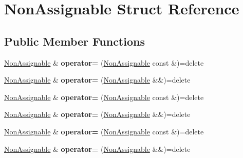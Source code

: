 \hypertarget{struct_non_assignable}{}\section{Non\+Assignable Struct Reference}
\label{struct_non_assignable}
\subsection*{Public Member Functions}
\begin{DoxyCompactItemize}
\item 
\mbox{\label{struct_non_assignable_aa1161016e3701d22b378b91ede9a65f8}} 
\mbox{\hyperlink{struct_non_assignable}{Non\+Assignable}} \& {\bfseries operator=} (\mbox{\hyperlink{struct_non_assignable}{Non\+Assignable}} const \&)=delete
\item 
\mbox{\label{struct_non_assignable_a41c6d6b75481da536d58f1e2b8b44207}} 
\mbox{\hyperlink{struct_non_assignable}{Non\+Assignable}} \& {\bfseries operator=} (\mbox{\hyperlink{struct_non_assignable}{Non\+Assignable}} \&\&)=delete
\item 
\mbox{\label{struct_non_assignable_aa1161016e3701d22b378b91ede9a65f8}} 
\mbox{\hyperlink{struct_non_assignable}{Non\+Assignable}} \& {\bfseries operator=} (\mbox{\hyperlink{struct_non_assignable}{Non\+Assignable}} const \&)=delete
\item 
\mbox{\label{struct_non_assignable_a41c6d6b75481da536d58f1e2b8b44207}} 
\mbox{\hyperlink{struct_non_assignable}{Non\+Assignable}} \& {\bfseries operator=} (\mbox{\hyperlink{struct_non_assignable}{Non\+Assignable}} \&\&)=delete
\item 
\mbox{\label{struct_non_assignable_aa1161016e3701d22b378b91ede9a65f8}} 
\mbox{\hyperlink{struct_non_assignable}{Non\+Assignable}} \& {\bfseries operator=} (\mbox{\hyperlink{struct_non_assignable}{Non\+Assignable}} const \&)=delete
\item 
\mbox{\label{struct_non_assignable_a41c6d6b75481da536d58f1e2b8b44207}} 
\mbox{\hyperlink{struct_non_assignable}{Non\+Assignable}} \& {\bfseries operator=} (\mbox{\hyperlink{struct_non_assignable}{Non\+Assignable}} \&\&)=delete

\end{DoxyCompactItemize}
